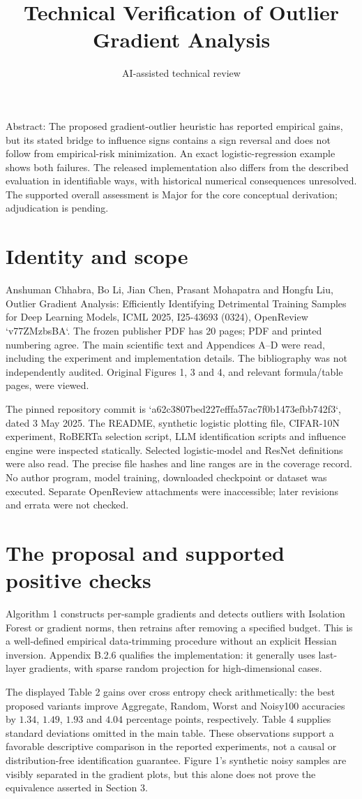 \documentclass[10pt]{article}
\title{Technical Verification of Outlier Gradient Analysis}
\author{AI-assisted technical review}
\date{}
\begin{document}
\maketitle
Abstract: The proposed gradient-outlier heuristic has reported empirical gains, but its stated bridge to influence signs contains a sign reversal and does not follow from empirical-risk minimization. An exact logistic-regression example shows both failures. The released implementation also differs from the described evaluation in identifiable ways, with historical numerical consequences unresolved. The supported overall assessment is Major for the core conceptual derivation; adjudication is pending.\par
\section*{Identity and scope}
Anshuman Chhabra, Bo Li, Jian Chen, Prasant Mohapatra and Hongfu Liu, Outlier Gradient Analysis: Efficiently Identifying Detrimental Training Samples for Deep Learning Models, ICML 2025, I25-43693 (0324), OpenReview `v77ZMzbsBA`. The frozen publisher PDF has 20 pages; PDF and printed numbering agree. The main scientific text and Appendices A–D were read, including the experiment and implementation details. The bibliography was not independently audited. Original Figures 1, 3 and 4, and relevant formula/table pages, were viewed.\par
The pinned repository commit is `a62c3807bed227efffa57ac7f0b1473efbb742f3`, dated 3 May 2025. The README, synthetic logistic plotting file, CIFAR-10N experiment, RoBERTa selection script, LLM identification scripts and influence engine were inspected statically. Selected logistic-model and ResNet definitions were also read. The precise file hashes and line ranges are in the coverage record. No author program, model training, downloaded checkpoint or dataset was executed. Separate OpenReview attachments were inaccessible; later revisions and errata were not checked.\par
\section*{The proposal and supported positive checks}
Algorithm 1 constructs per-sample gradients and detects outliers with Isolation Forest or gradient norms, then retrains after removing a specified budget. This is a well-defined empirical data-trimming procedure without an explicit Hessian inversion. Appendix B.2.6 qualifies the implementation: it generally uses last-layer gradients, with sparse random projection for high-dimensional cases.\par
The displayed Table 2 gains over cross entropy check arithmetically: the best proposed variants improve Aggregate, Random, Worst and Noisy100 accuracies by \(1.34\), \(1.49\), \(1.93\) and \(4.04\) percentage points, respectively. Table 4 supplies standard deviations omitted in the main table. These observations support a favorable descriptive comparison in the reported experiments, not a causal or distribution-free identification guarantee. Figure 1’s synthetic noisy samples are visibly separated in the gradient plots, but this alone does not prove the equivalence asserted in Section 3.\par
\end{document}
